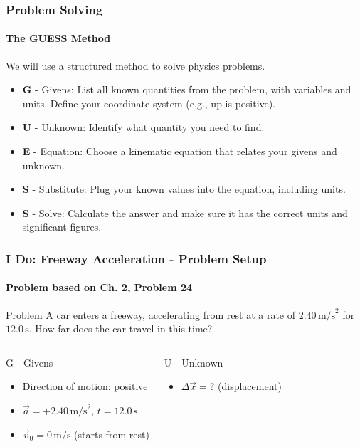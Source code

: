 \documentclass{beamer}
\begin{document}
\begin{frame}
\frametitle{Problem Solving}
\framesubtitle{The GUESS Method}
We will use a structured method to solve physics problems.
\begin{itemize}
    \item \textbf{G} - \alert{Givens}: List all known quantities from the problem, with variables and units. Define your coordinate system (e.g., up is positive).
    \item \textbf{U} - \alert{Unknown}: Identify what quantity you need to find.
    \item \textbf{E} - \alert{Equation}: Choose a kinematic equation that relates your givens and unknown.
    \item \textbf{S} - \alert{Substitute}: Plug your known values into the equation, including units.
    \item \textbf{S} - \alert{Solve}: Calculate the answer and make sure it has the correct units and significant figures.
\end{itemize}
\end{frame}

\begin{frame}
\frametitle{I Do: Freeway Acceleration - Problem Setup}
\framesubtitle{Problem based on Ch. 2, Problem 24}
\begin{block}{Problem}
A car enters a freeway, accelerating from rest at a rate of $2.40 \, \text{m/s}^2$ for $12.0 \, \text{s}$. How far does the car travel in this time?
\end{block}
\pause
\begin{columns}[T]
\begin{block}{G - Givens}
\begin{itemize}
\item Direction of motion: positive
\item $\vec{a} = +2.40 \, \text{m/s}^2$, $t = 12.0 \, \text{s}$
\item $\vec{v}_0 = 0 \, \text{m/s}$ (starts from rest)
\end{itemize}
\end{block}
\pause
{}
\begin{block}{U - Unknown}
\begin{itemize}
\item $\Delta \vec{x} = ?$ (displacement)
\end{itemize}
\end{block}
\end{columns}
\end{frame}
\end{document}
